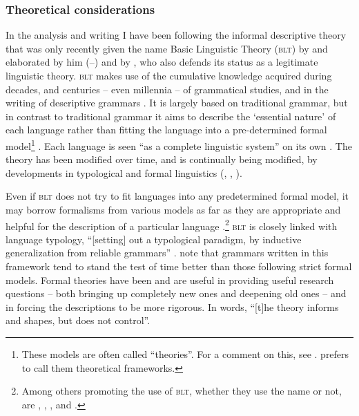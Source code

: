 \subsubsection{Theoretical considerations}
In the analysis and writing I have been following the informal descriptive theory that was only recently given the name Basic Linguistic Theory (\textsc{blt}) by \citet{Dixon1997} and elaborated by him (\citeyear{Dryer2010}--\citeyear{Dryer2012}) and by \citet{Dryer2006a, 2006b}, who also defends its status as a legitimate linguistic theory. \textsc{blt} makes use of the cumulative knowledge acquired during decades, and centuries -- even millennia -- of grammatical studies, and in the writing of descriptive grammars \citep[3]{Dixon2010}. It is largely based on traditional grammar, but in contrast to traditional grammar it aims to describe the `essential nature' of each language rather than fitting the language into a pre-determined formal model\footnote{These models are often called ``theories''.  For a comment on this, see \citet[131]{Dixon1997}. \citet{Dryer2006a} prefers to call them theoretical frameworks.} \citep[211]{Dryer2006a}. Each language is seen ``as a complete linguistic system'' on its own \citep[4]{Dixon2010}. The theory has been modified over time, and is continually being modified, by developments in typological and formal linguistics (\citealt{EvansEtAl2006}, \citealt{Rice2006a, Rice2006b}, \citealt[3]{Dixon2010}).  

Even if \textsc{blt} does not try to fit languages into any predetermined formal model, it may borrow formalisms from various models as far as they are appropriate and helpful for the description of a particular language \citep[128--135]{Dixon1997}.\footnote{Among others promoting the use of \textsc{blt}, whether they use the name or not, are
\citet[354]{Noonan2006}, 
\citet{Rice2006a, Rice2006b}, 
\citet{EvansEtAl2006}, and \citet{Payne1997, Payne2006}.}  \textsc{blt} is closely linked with language typology, ``[setting] out a typological paradigm, by inductive generalization from reliable grammars'' \citep[205]{Dixon2010}. \citet[6]{EvansEtAl2006} note that grammars written in this framework tend to stand the test of time better than those following strict formal models. Formal theories have been and are useful in providing useful research questions -- both bringing up completely new ones and deepening old ones -- and in forcing the descriptions to be more rigorous. In  words, ``[t]he theory informs and shapes, but does not control''. 




